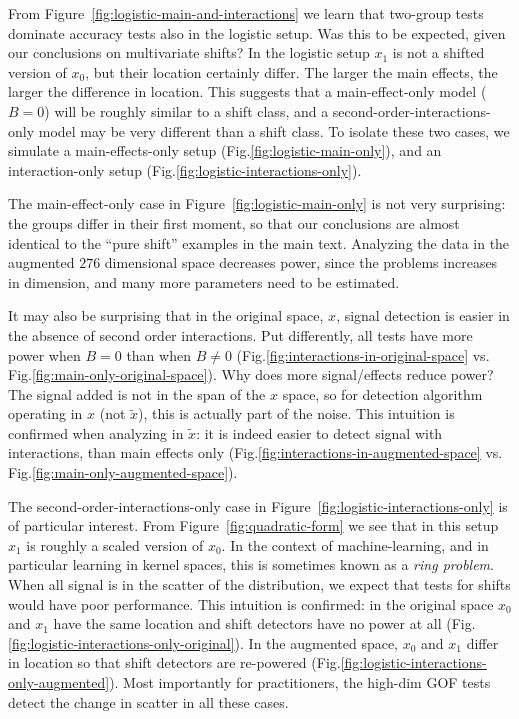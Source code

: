 \documentclass[]{bio}
\begin{document}
From Figure~\ref{fig:logistic-main-and-interactions} we learn that two-group tests dominate accuracy tests also in the logistic setup.
Was this to be expected, given our conclusions on multivariate shifts?
In the logistic setup $x_1$ is not a shifted version of $x_0$, but their location certainly differ. 
The larger the main effects, the larger the difference in location.
This suggests that a main-effect-only model ($B=0$) will be roughly similar to a shift class, and a second-order-interactions-only model may be very different than a shift class.
To isolate these two cases, we simulate a main-effects-only setup (Fig.\ref{fig:logistic-main-only}), and an interaction-only setup (Fig.\ref{fig:logistic-interactions-only}).


The main-effect-only case in Figure~\ref{fig:logistic-main-only} is not very surprising: 
the groups differ in their first moment, so that our conclusions are almost identical to the ``pure shift'' examples in the main text.
Analyzing the data in the augmented $276$ dimensional space decreases power, since the problems increases in dimension, and many more parameters need to be estimated. 

It may also be surprising that in the original space, $x$, signal detection is easier in the absence of second order interactions. 
Put differently, all tests have more power when $B=0$ than when $B \neq 0$ (Fig.\ref{fig:interactions-in-original-space} vs. Fig.\ref{fig:main-only-original-space}). 
Why does more signal/effects reduce power? 
The signal added is not in the span of the $x$ space, so for detection algorithm operating in $x$ (not $\tilde{x}$), this is actually part of the noise. 
This intuition is confirmed when analyzing in $\tilde x$: it is indeed easier to detect signal with interactions, than main effects only (Fig.\ref{fig:interactions-in-augmented-space} vs. Fig.\ref{fig:main-only-augmented-space}).

The second-order-interactions-only case in Figure~\ref{fig:logistic-interactions-only} is of particular interest. 
From Figure~\ref{fig:quadratic-form} we see that in this setup $x_1$ is roughly a scaled version of $x_0$.
In the context of machine-learning, and in particular learning in kernel spaces, this is sometimes known as a \emph{ring problem}.
When all signal is in the scatter of the distribution, we expect that tests for shifts would have poor performance. 
This intuition is confirmed: in the original space $x_0$ and $x_1$ have the same location and shift detectors have no power at all (Fig.\ref{fig:logistic-interactions-only-original}). 
In the augmented space, $x_0$ and $x_1$ differ in location so that shift detectors are re-powered (Fig.\ref{fig:logistic-interactions-only-augmented}). 
Most importantly for practitioners, the high-dim GOF tests detect the change in scatter in all these cases. 
\end{document}
